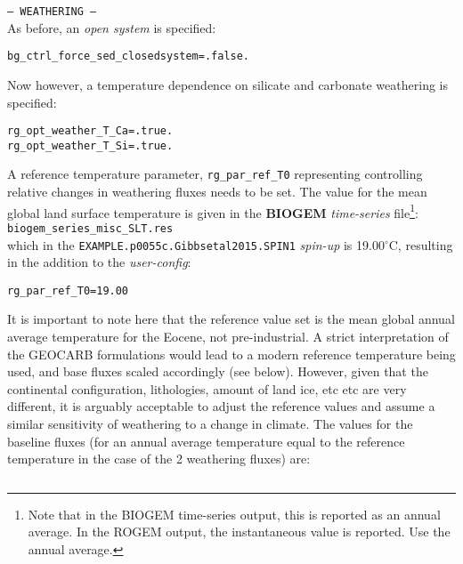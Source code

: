\documentclass[10pt,twoside]{article}
\begin{document}
\begin{compactitem}
                \item \texttt{--- WEATHERING ---}
                \\ As before, an \textit{open  system} is specified:
\vspace{-5pt}\begin{verbatim}
bg_ctrl_force_sed_closedsystem=.false.
                \end{verbatim}\vspace{-5pt}
                Now however, a temperature dependence on silicate and carbonate weathering is specified:
\vspace{-5pt}\begin{verbatim}
rg_opt_weather_T_Ca=.true.
rg_opt_weather_T_Si=.true.
                \end{verbatim}\vspace{-5pt}
A reference temperature parameter, \texttt{rg\_par\_ref\_T0} representing controlling relative changes in weathering fluxes needs to be set. The value for the mean global land surface temperature is given in the \textbf{BIOGEM} \textit{time-series} file\footnote{Note that in the BIOGEM time-series output, this is reported as an annual average. In the ROGEM output, the instantaneous value is reported. Use the annual average.}:
\\\texttt{biogem\_series\_misc\_SLT.res}
\\which in the \texttt{EXAMPLE.p0055c.Gibbsetal2015.SPIN1} \textit{spin-up} is 19.00$^{\circ}$C, resulting in the addition to the \textit{user-config}:
\vspace{-5pt}\begin{verbatim}
rg_par_ref_T0=19.00
                \end{verbatim}\vspace{-5pt}
                It is important to note here that the reference value set is the mean global annual average temperature for the Eocene, not pre-industrial. A strict interpretation of the GEOCARB formulations would lead to a modern reference temperature being used, and base fluxes scaled accordingly (see below). However, given that the continental configuration, lithologies, amount of land ice, etc etc are very different, it is arguably acceptable to adjust the reference values and assume a similar sensitivity of weathering to a change in climate.
The values for the baseline fluxes (for an annual average temperature equal to the reference temperature in the case of the 2 weathering fluxes) are:
\vspace{-5pt}\begin{verbatim}

\end{verbatim}
\end{compactitem}
\end{document}
